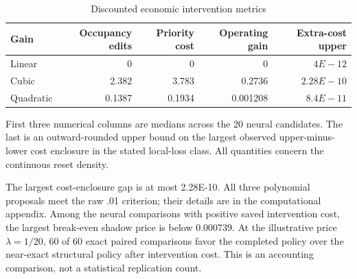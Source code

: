 \begin{table}[htbp]
\centering\footnotesize
\caption{Discounted economic intervention metrics}\label{tab:econ30}
\begin{tabular}{lrrrr}\toprule
Gain & Occupancy edits & Priority cost & Operating gain & Extra-cost upper \\\midrule
Linear & 0 & 0 & 0 & $4E-12$ \\
Cubic & 2.382 & 3.783 & 0.2736 & $2.28E-10$ \\
Quadratic & 0.1387 & 0.1934 & 0.001208 & $8.4E-11$ \\
\bottomrule\end{tabular}
\par\smallskip\begin{minipage}{.98\textwidth}\footnotesize First three numerical columns are medians across the 20 neural candidates. The last is an outward-rounded upper bound on the largest observed upper-minus-lower cost enclosure in the stated local-loss class. All quantities concern the continuous reset density.\end{minipage}
\end{table}
The largest cost-enclosure gap is at most 2.28E-10. All three polynomial proposals meet the raw .01 criterion; their details are in the computational appendix. Among the neural comparisons with positive saved intervention cost, the largest break-even shadow price is below 0.000739. At the illustrative price $\lambda=1/20$, 60 of 60 exact paired comparisons favor the completed policy over the near-exact structural policy after intervention cost. This is an accounting comparison, not a statistical replication count.
